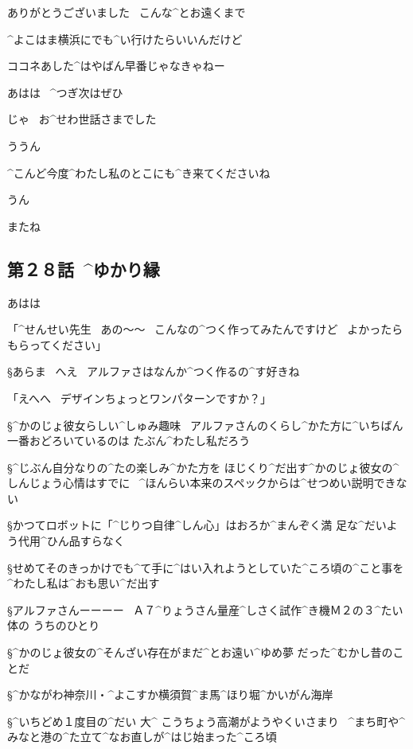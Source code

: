 \page
\K ありがとうございました
\ こんな^{とお}{遠}くまで

\A ^{よこはま}{横浜}にでも^{い}{行}けたらいいんだけど

\A ココネあした^{はやばん}{早番}じゃなきゃねー

\K あはは
\ ^{つぎ}{次}はぜひ

\K じゃ
\ お^{せわ}{世話}さまでした

\A ううん

\page
\K ^{こんど}{今度}^{わたし}{私}のとこにも^{き}{来}てくださいね

\A うん

\page[60]
 またね


\subsection{第２８話\ ^{ゆかり}{縁}}

\page[62]
\A あはは

\A 「^{せんせい}{先生}
\ あの〜〜
\ こんなの^{つく}{作}ってみたんですけど
\ よかったらもらってください」

\S あらま
\ へえ
\ アルファさはなんか^{つく}{作}るの^{す}{好}きね

\A 「えへへ
\ デザインちょっとワンパターンですか？」

\page
\S ^{かのじょ}{彼女}らしい^{しゅみ}{趣味}
\ アルファさんのくらし^{かた}{方}に^{いちばん}{一番}おどろいているのは
たぶん^{わたし}{私}だろう

\S ^{じぶん}{自分}なりの^{たの}{楽}しみ^{かた}{方}を
ほじくり^{だ}{出}す^{かのじょ}{彼女}の^{しんじょう}{心情}はすでに
\ ^{ほんらい}{本来}のスペックからは^{せつめい}{説明}できない

\S かつてロボットに「^{じりつ}{自律}^{しん}{心}」はおろか^{まんぞく}{満
  足}な^{だいよう}{代用}^{ひん}{品}すらなく

\S せめてそのきっかけでも^{て}{手}に^{はい}{入}れようとしていた^{ころ}{頃}の^{こと}{事}を
^{わたし}{私}は^{おも}{思}い^{だ}{出}す

\S アルファさんーーーー
\ Ａ７^{りょうさん}{量産}^{しさく}{試作}^{き}{機}Ｍ２の３^{たい}{体}の
うちのひとり

\S ^{かのじょ}{彼女}の^{そんざい}{存在}がまだ^{とお}{遠}い^{ゆめ}{夢}
だった^{むかし}{昔}のことだ

\page
\S ^{かながわ}{神奈川}・^{よこすか}{横須賀}^{ま}{馬}^{ほり}{堀}^{かいがん}{海岸}

\S ^{いちどめ}{１度目}の^{だい }{大}^{ こうちょう}{高潮}がようやくいさまり
\ ^{まち}{町}や^{みなと}{港}の^{た}{立}て^{なお}{直}しが^{はじ}{始}まった^{ころ}{頃}

